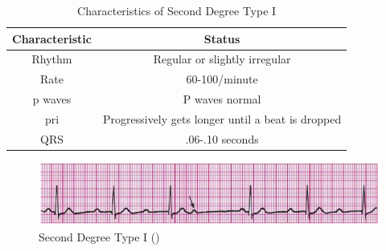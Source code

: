 \begin{table}[H]
\begin{center}
\begin{tabular}{||c || c||}
 \hline
\textbf{Characteristic} & \textbf{Status} \\ [0.4ex] 
 \hline\hline
 Rhythm & Regular or slightly irregular \\
\hline
Rate & 60-100/minute \\
\hline
p waves & P waves normal  \\
\hline
pri & Progressively gets longer until a beat is dropped     \\
\hline
QRS & .06-.10 seconds \\
\hline\hline
\end{tabular}
\end{center}
\caption{Characteristics of Second Degree Type I}
\label{table:IIAVB_characteristics}
\end{table}

 \begin{figure}[H]
\centering
\includegraphics[scale=0.8]{img/IIAVB.png}
\caption{Second Degree Type I (\cite{arryth_types})}
\label{fig:IIAVB}
\end{figure}


